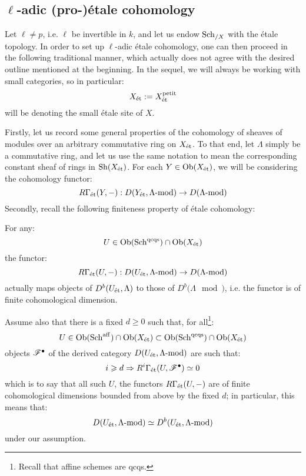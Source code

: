    \subsection{\texorpdfstring{$\ell$}{}-adic (pro-)\'etale cohomology}
        Let $\ell \not = p$, i.e. $\ell$ be invertible in $k$, and let us endow $\mathrm{Sch}_{/X}$ with the \'etale topology. In order to set up $\ell$-adic \'etale cohomology, one can then proceed in the following traditional manner, which actually does not agree with the desired outline mentioned at the beginning. In the sequel, we will always be working with small categories, so in particular:
            $$X_{\mathrm{\acute{e}t}} := X_{\mathrm{\acute{e}t}}^{\mathrm{petit}}$$
        will be denoting the small \'etale site of $X$. 

        Firstly, let us record some general properties of the cohomology of sheaves of modules over an arbitrary commutative ring on $X_{\mathrm{\acute{e}t}}$. To that end, let $\Lambda$ simply be a commutative ring, and let us use the same notation to mean the corresponding constant sheaf of rings in $\mathrm{Sh}(X_{\mathrm{\acute{e}t}})$. For each $Y \in \mathrm{Ob}(X_{\mathrm{\acute{e}t}})$, we will be considering the cohomology functor:
            $$R\Gamma_{\mathrm{\acute{e}t}}(Y, -): D(Y_{\mathrm{\acute{e}t}}, \Lambda\text{-}\mathrm{mod}) \to D(\Lambda\text{-}\mathrm{mod})$$
        Secondly, recall the following finiteness property of \'etale cohomology:
        \begin{lemma} \label{lemma: finiteness_of_etale_cohomology}
            \cite[Lemma 6.4.2]{bhatt_scholze_2014_pro_etale} For any:
                $$U \in \mathrm{Ob}(\mathrm{Sch}^{\mathrm{qc}\mathrm{qs}}) \cap \mathrm{Ob}(X_{\mathrm{\acute{e}t}})$$
            the functor:
                $$R\Gamma_{\mathrm{\acute{e}t}}(U, -): D(U_{\mathrm{\acute{e}t}}, \Lambda\text{-}\mathrm{mod}) \to D(\Lambda\text{-}\mathrm{mod})$$
            actually maps objects of $D^b(U_{\mathrm{\acute{e}t}}, \Lambda)$ to those of $D^b(\Lambda\mod)$, i.e. the functor is of finite cohomological dimension.
        \end{lemma}

        \begin{convention}
            Assume also that there is a fixed $d \geq 0$ such that, for all\footnote{Recall that affine schemes are qcqs.}:
                $$U \in \mathrm{Ob}(\mathrm{Sch}^{\mathrm{aff}}) \cap \mathrm{Ob}(X_{\mathrm{\acute{e}t}}) \subset \mathrm{Ob}(\mathrm{Sch}^{\mathrm{qc}\mathrm{qs}}) \cap \mathrm{Ob}(X_{\mathrm{\acute{e}t}})$$
            objects $\mathscr{F}^{\bullet}$ of the derived category $D(U_{\mathrm{\acute{e}t}}, \Lambda\text{-}\mathrm{mod})$ are such that:
                $$i \geqslant d \Rightarrow R^i\Gamma_{\mathrm{\acute{e}t}}(U, \mathscr{F}^{\bullet}) \simeq 0$$
            which is to say that all such $U$, the functors $R\Gamma_{\mathrm{\acute{e}t}}(U, -)$ are of finite cohomological dimensions bounded from above by the fixed $d$; in particular, this means that:
                $$D(U_{\mathrm{\acute{e}t}}, \Lambda\text{-}\mathrm{mod}) \simeq D^b(U_{\mathrm{\acute{e}t}}, \Lambda\text{-}\mathrm{mod})$$
            under our assumption. 
        \end{convention}
    
